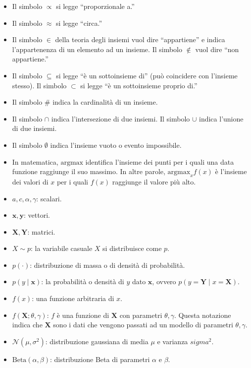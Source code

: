 \documentclass[
  10pt,
  italian,
  a4paper,
  extrafontsizes,onecolumn,openright
  ]{memoir}
\begin{document}
\begin{itemize}
\item
  Il simbolo \(\propto\) si legge ``proporzionale a.''
\item
  Il simbolo \(\approx\) si legge ``circa.''
\item
  Il simbolo \(\in\) della teoria degli insiemi vuol dire ``appartiene'' e
  indica l'appartenenza di un elemento ad un insieme. Il simbolo
  \(\notin\) vuol dire ``non appartiene.''
\item
  Il simbolo \(\subseteq\) si legge ``è un sottoinsieme di'' (può
  coincidere con l'insieme stesso). Il simbolo \(\subset\) si legge ``è
  un sottoinsieme proprio di.''
\item
  Il simbolo \(\#\) indica la cardinalità di un insieme.
\item
  Il simbolo \(\cap\) indica l'intersezione di due insiemi. Il simbolo
  \(\cup\) indica l'unione di due insiemi.
\item
  Il simbolo \(\emptyset\) indica l'insieme vuoto o evento impossibile.
\item
  In matematica, \(\mbox{argmax}\) identifica l'insieme dei punti per i quali una data funzione raggiunge il suo massimo. In altre parole, \(\mbox{argmax}_x f(x)\) è l'insieme dei valori di \(x\) per i quali \(f(x)\) raggiunge il valore più alto.
\item
  \(a, c, \alpha, \gamma\): scalari.
\item
  \(\boldsymbol{x}, \boldsymbol{y}\): vettori.
\item
  \(\boldsymbol{X}, \boldsymbol{Y}\): matrici.
\item
  \(X \sim p\): la variabile casuale \(X\) si distribuisce come \(p\).
\item
  \(p(\cdot)\): distribuzione di massa o di densità di probabilità.
\item
  \(p(y \mid \boldsymbol{x})\): la probabilità o densità di \(y\) dato \(\boldsymbol{x}\), ovvero \(p(y = \boldsymbol{Y} \mid x = \boldsymbol{X})\).
\item
  \(f(x)\): una funzione arbitraria di \(x\).
\item
  \(f(\boldsymbol{X}; \theta, \gamma)\): \(f\) è una funzione di \(\boldsymbol{X}\) con parametri \(\theta, \gamma\). Questa notazione indica che \(\boldsymbol{X}\) sono i dati che vengono passati ad un modello di parametri \(\theta, \gamma\).
\item
  \(\mathcal{N}(\mu, \sigma^2)\): distribuzione gaussiana di media \(\mu\) e varianza \(sigma^2\).
\item
  \(\mbox{Beta}(\alpha, \beta)\): distribuzione Beta di parametri \(\alpha\) e \(\beta\).

\end{itemize}
\end{document}
